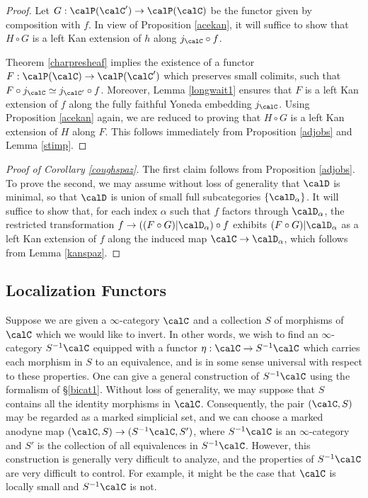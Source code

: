 \begin{proof}
Let $G: \calP(\calC') \rightarrow \calP(\calC)$ be the functor given by composition with $f$.
In view of Proposition \ref{acekan}, it will suffice to show that $H \circ G$ is a 
left Kan extension of $h$ along $j_{\calC} \circ f$.
 
Theorem \ref{charpresheaf} implies the existence of a functor
$F: \calP(\calC) \rightarrow \calP(\calC')$ which preserves small colimits, such that
$F \circ j_{\calC} \simeq j_{\calC'} \circ f$. Moreover, Lemma \ref{longwait1} ensures that
$F$ is a left Kan extension of $f$ along the fully faithful Yoneda embedding $j_{\calC}$. 
Using Proposition \ref{acekan} again, we are reduced to proving that
$H \circ G$ is a left Kan extension of $H$ along $F$. This follows immediately from Proposition \ref{adjobs} and Lemma \ref{stimp}.
\end{proof}

\begin{proof}[Proof of Corollary \ref{coughspaz}]
The first claim follows from Proposition \ref{adjobs}. To prove the second, we may assume without loss of generality that $\calD$ is minimal, so that $\calD$ is union of small full subcategories
$\{ \calD_{\alpha} \}$. It will suffice to show that, for each index $\alpha$ such that $f$ factors
through $\calD_{\alpha}$, the restricted transformation $f \rightarrow ((F \circ G)| \calD_{\alpha}) \circ f$ exhibits $(F \circ G)| \calD_{\alpha}$ as a left Kan extension of
$f$ along the induced map $\calC \rightarrow \calD_{\alpha}$, which follows from Lemma \ref{kanspaz}.
\end{proof}

\subsection{Localization Functors}\label{locfunc}

Suppose we are given a $\infty$-category $\calC$ and a collection $S$ of morphisms
of $\calC$ which we would like to invert. In other words, we wish to find an $\infty$-category $S^{-1} \calC$ equipped with a functor $\eta: \calC \rightarrow S^{-1} \calC$ which carries each morphism in $S$ to an equivalence, and is in some sense universal with respect to these properties.
One can give a general construction of $S^{-1} \calC$ using the formalism of \S \ref{bicat1}. Without loss of generality, we may suppose that $S$ contains all the identity morphisms in $\calC$. Consequently, the pair $(\calC, S)$ may be regarded as a marked simplicial set, and we can choose a marked anodyne map $( \calC, S) \rightarrow ( S^{-1} \calC, S')$, where $S^{-1} \calC$ is an $\infty$-category and $S'$ is the collection of all equivalences in $S^{-1} \calC$. However, this construction is generally very difficult to analyze, and the properties of $S^{-1} \calC$ are very difficult to control. For example, it might be the case that $\calC$ is locally small and $S^{-1} \calC$ is not.

